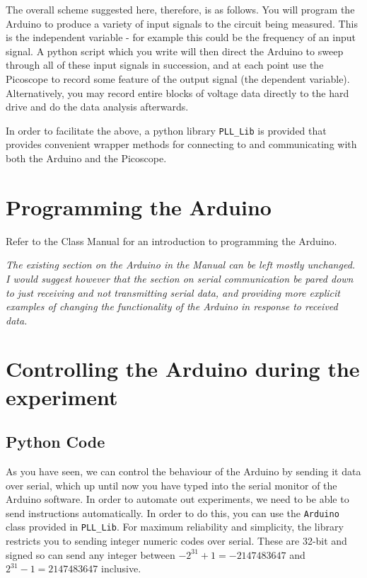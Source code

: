 \documentclass{article}
\begin{document}
The overall scheme suggested here, therefore, is as follows. You will program the Arduino to produce a variety of input signals to the circuit being measured. This is the independent variable - for example this could be the frequency of an input signal. A python script which you write will then direct the Arduino to sweep through all of these input signals in succession, and at each point use the Picoscope to record some feature of the output signal (the dependent variable). Alternatively, you may record entire blocks of voltage data directly to the hard drive and do the data analysis afterwards.

In order to facilitate the above, a python library \texttt{PLL\_Lib} is provided that provides convenient wrapper methods for connecting to and communicating with both the Arduino and the Picoscope.

\section{Programming the Arduino}
Refer to the Class Manual for an introduction to programming the Arduino.

\textit{
The existing section on the Arduino in the Manual can be left mostly unchanged. I would suggest however that the section on serial communication be pared down to just receiving and not transmitting serial data, and providing more explicit examples of changing the functionality of the Arduino in response to received data.}

\section{Controlling the Arduino during the experiment}
\subsection{Python Code}
As you have seen, we can control the behaviour of the Arduino by sending it data over serial, which up until now you have typed into the serial monitor of the Arduino software. In order to automate out experiments, we need to be able to send instructions automatically. In order to do this, you can use the \texttt{Arduino} class provided in \texttt{PLL\_Lib}. For maximum reliability and simplicity, the library restricts you to sending integer numeric codes over serial. These are 32-bit and signed so can send any integer between $-2^{31} + 1 = -2147483647$ and $2^{31} - 1 = 2147483647$ inclusive.
\end{document}
